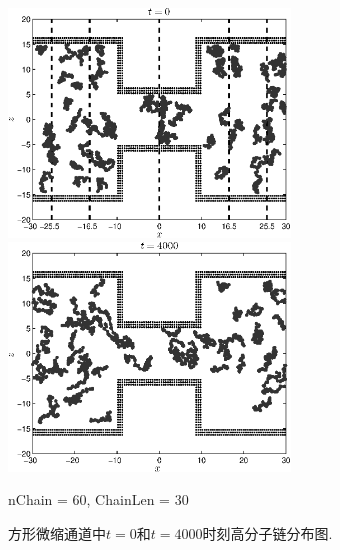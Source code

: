 \documentclass[twoside,12pt]{article}
\begin{document}
\begin{figure}[!htb]
\centering
\begin{minipage}[c]{0.5\textwidth}
\centering
\includegraphics[width=7.5cm]{./figures/chainT0s.eps}
\end{minipage}%
\begin{minipage}[c]{0.5\textwidth}
\centering
\includegraphics[width=7.5cm]{./figures/chainT4000s.eps}
\end{minipage}
\small nChain = 60, ChainLen = 30\\
\caption{\label{chainT}\small 方形微缩通道中$t=0$和$t=4000$时刻高分子链分布图.}
\end{figure}
\end{document}
